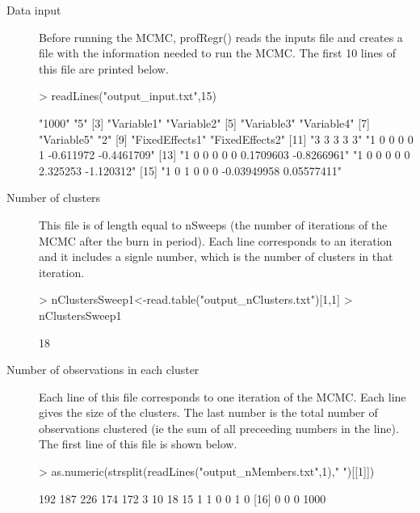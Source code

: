 \documentclass{article}
\begin{document}
\begin{description}
\item[Data input] Before running the MCMC, profRegr() reads the inputs file and creates a file with the information needed to run the MCMC. The first 10 lines of this file are printed below. 
\begin{Schunk}
\begin{Sinput}
> readLines("output_input.txt",15)
\end{Sinput}
\begin{Soutput}
 [1] "1000"                               "5"                                 
 [3] "Variable1"                          "Variable2"                         
 [5] "Variable3"                          "Variable4"                         
 [7] "Variable5"                          "2"                                 
 [9] "FixedEffects1"                      "FixedEffects2"                     
[11] "3 3 3 3 3"                          "1 0 0 0 0 1 -0.611972 -0.4461709"  
[13] "1 0 0 0 0 0 0.1709603 -0.8266961"   "1 0 0 0 0 0 2.325253 -1.120312"    
[15] "1 0 1 0 0 0 -0.03949958 0.05577411"
\end{Soutput}
\end{Schunk}

\item[Number of clusters] This file is of length equal to nSweeps (the number of iterations of the MCMC after the burn in period). Each line corresponds to an iteration and it includes a signle number, which is the number of clusters in that iteration. 
\begin{Schunk}
\begin{Sinput}
> nClustersSweep1<-read.table("output_nClusters.txt")[1,1]
> nClustersSweep1
\end{Sinput}
\begin{Soutput}
[1] 18
\end{Soutput}
\end{Schunk}

\item[Number of observations in each cluster] Each line of this file corresponds to one iteration of the MCMC. Each line gives the size of the clusters. The last number is the total number of observations clustered (ie the sum of all preceeding numbers in the line). The first line of this file is shown below.  
\begin{Schunk}
\begin{Sinput}
> as.numeric(strsplit(readLines("output_nMembers.txt",1)," ")[[1]])
\end{Sinput}
\begin{Soutput}
 [1]  192  187  226  174  172    3   10   18   15    1    1    0    0    1    0
[16]    0    0    0 1000
\end{Soutput}
\end{Schunk}


\end{description}
\end{document}
